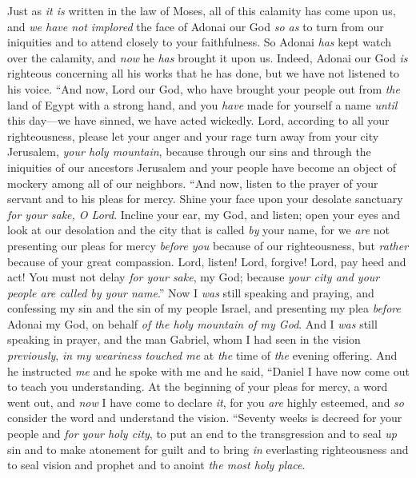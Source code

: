 \begin{biblechapter}
\verse Just as \textit{it is} written in the law of Moses, all of this calamity has come upon us, and \textit{we have not implored} the face of Adonai our God \textit{so as} to turn from our iniquities and to attend closely to your faithfulness.
\verse So Adonai \textit{has} kept watch over the calamity, and \textit{now} he \textit{has} brought it upon us. Indeed, Adonai our God \textit{is} righteous concerning all his works that he has done, but we have not listened to his voice.
\verse “And now, Lord our God, who have brought your people out from \textit{the} land of Egypt with a strong hand, and you \textit{have} made for yourself a name \textit{until} this day—we have sinned, we have acted wickedly.
\verse Lord, according to all your righteousness, please let your anger and your rage turn away from your city Jerusalem, \textit{your holy mountain}, because through our sins and through the iniquities of our ancestors Jerusalem and your people have become an object of mockery among all of our neighbors.
\verse “And now, listen to the prayer of your servant and to his pleas for mercy. Shine your face upon your desolate sanctuary \textit{for your sake, O Lord}.
\verse Incline your ear, my God, and listen; open your eyes and look at our desolation and the city that is called \textit{by} your name, for we \textit{are} not presenting our pleas for mercy \textit{before you} because of our righteousness, but \textit{rather} because of your great compassion.
\verse Lord, listen! Lord, forgive! Lord, pay heed and act! You must not delay \textit{for your sake}, my God; because \textit{your city and your people are called by your name}.”
 Now I \textit{was} still speaking and praying, and confessing my sin and the sin of my people Israel, and presenting my plea \textit{before} Adonai my God, on behalf \textit{of the holy mountain of my God}.
\verse And I \textit{was} still speaking in prayer, and the man Gabriel, whom I had seen in the vision \textit{previously}, \textit{in my weariness touched me} at \textit{the} time of \textit{the} evening offering.
\verse And he instructed \textit{me} and he spoke with me and he said, “Daniel I have now come out to teach you understanding.
\verse At the beginning of your pleas for mercy, a word went out, and \textit{now} I have come to declare \textit{it}, for you \textit{are} highly esteemed, and \textit{so} consider the word and understand the vision.
 “Seventy weeks is decreed for your people and \textit{for your holy city}, to put an end to the transgression and to seal \textit{up} sin and to make atonement for guilt and to bring \textit{in} everlasting righteousness and to seal vision and prophet and to anoint \textit{the most holy place}.

\end{biblechapter}
